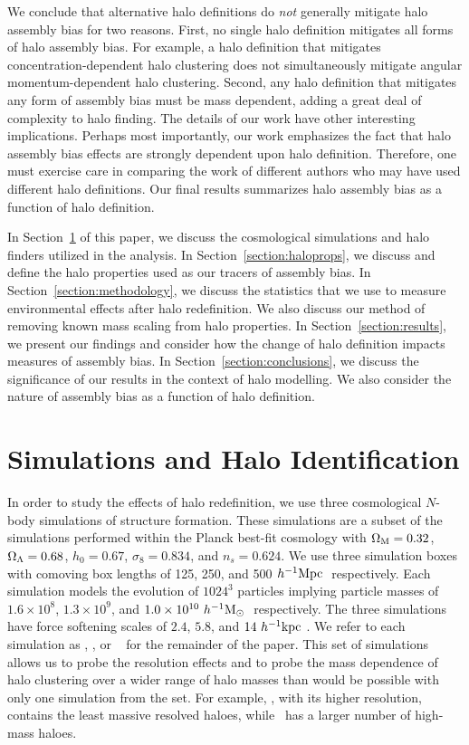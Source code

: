 \documentclass[usenatbib,fleqn]{mnras}
\begin{document}
We conclude that alternative halo definitions do {\em not} generally mitigate halo assembly bias for two reasons. First, no single halo definition mitigates all forms of halo assembly bias. For example, a halo definition that mitigates concentration-dependent halo clustering does not simultaneously mitigate angular momentum-dependent halo clustering. Second, any halo definition that mitigates any form  of assembly bias must be mass dependent, adding a great deal of complexity to halo finding. The details of our work have other interesting implications. Perhaps most importantly, our work emphasizes the fact that halo assembly bias effects are strongly dependent upon halo definition. Therefore, one must exercise care in comparing the work of different authors who may have used different halo definitions. Our final results summarizes halo assembly bias as a function of halo definition.
 
In Section~\ref{section:data} of this paper, we discuss the cosmological simulations and halo finders utilized in the analysis. In Section~\ref{section:haloprops}, we discuss and define the halo properties used as our tracers of assembly bias. In Section~\ref{section:methodology}, we discuss the statistics that we use to measure environmental effects after halo redefinition. We also discuss our method of removing known mass scaling from halo properties. In Section~\ref{section:results}, we present our findings and consider how the change of halo definition impacts measures of assembly bias. In Section~\ref{section:conclusions}, we discuss the significance of our results in the context of halo modelling. We also consider the nature of assembly bias as a function of halo definition.

\section[]{Simulations and Halo Identification}
\label{section:data}


In order to study the effects of halo redefinition, we use three cosmological $N$-body simulations of structure formation. These simulations are a subset of the  \citet{diemer_kravtsov15} simulations performed within the Planck best-fit cosmology with $\Omega_{\mathrm{M}} = 0.32$, $\Omega_{\Lambda} = 0.68$, $h_0 = 0.67$, $\sigma_8 = 0.834$, and $n_s = 0.624$. We use three simulation boxes with comoving box lengths of 125, 250, and 500$\ h^{-1}\mathrm{Mpc}~$ respectively. Each simulation models the evolution of $1024^3$ particles implying particle masses of $1.6 \times 10^8$, $1.3 \times 10^9$, and $1.0 \times 10^{10}\ h^{-1}\mathrm{M}_{\odot}~$ respectively. The three simulations have force softening scales of $2.4$, $5.8$, and $14 \ h^{-1}\mathrm{kpc}~$. We refer to each simulation as \simA, \simB, or \simC~ for the remainder of the paper. This set of simulations allows us to probe the resolution effects and to probe the mass dependence of halo clustering over a wider range of halo masses than would be possible with only one simulation from the set. For example, \simA, with its higher resolution, contains the least massive resolved haloes, while \simC~has a larger number of high-mass haloes.
\end{document}
